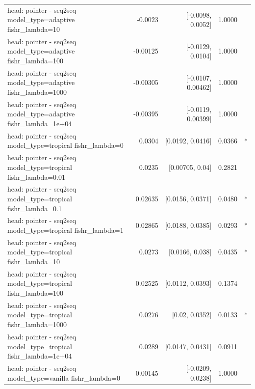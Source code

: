 \documentclass[10pt]{article}
\makeatletter
\newcommand{\stackcell}[1]{\begin{tabular}[t]{@{}l@{}}#1\end{tabular}}
\makeatother
\begin{document}
{\begin{longtable}{lrrrl}
\stackcell{head: pointer - seq2seq\\\footnotesize model\_type=adaptive fishr\_lambda=10 } & -0.0023 & [-0.0098, 0.0052] & 1.0000 & \\
\stackcell{head: pointer - seq2seq\\\footnotesize model\_type=adaptive fishr\_lambda=100 } & -0.00125 & [-0.0129, 0.0104] & 1.0000 & \\
\stackcell{head: pointer - seq2seq\\\footnotesize model\_type=adaptive fishr\_lambda=1000 } & -0.00305 & [-0.0107, 0.00462] & 1.0000 & \\
\stackcell{head: pointer - seq2seq\\\footnotesize model\_type=adaptive fishr\_lambda=1e+04 } & -0.00395 & [-0.0119, 0.00399] & 1.0000 & \\
\stackcell{head: pointer - seq2seq\\\footnotesize model\_type=tropical fishr\_lambda=0 } & 0.0304 & [0.0192, 0.0416] & 0.0366 & *\\
\stackcell{head: pointer - seq2seq\\\footnotesize model\_type=tropical fishr\_lambda=0.01 } & 0.0235 & [0.00705, 0.04] & 0.2821 & \\
\stackcell{head: pointer - seq2seq\\\footnotesize model\_type=tropical fishr\_lambda=0.1 } & 0.02635 & [0.0156, 0.0371] & 0.0480 & *\\
\stackcell{head: pointer - seq2seq\\\footnotesize model\_type=tropical fishr\_lambda=1 } & 0.02865 & [0.0188, 0.0385] & 0.0293 & *\\
\stackcell{head: pointer - seq2seq\\\footnotesize model\_type=tropical fishr\_lambda=10 } & 0.0273 & [0.0166, 0.038] & 0.0435 & *\\
\stackcell{head: pointer - seq2seq\\\footnotesize model\_type=tropical fishr\_lambda=100 } & 0.02525 & [0.0112, 0.0393] & 0.1374 & \\
\stackcell{head: pointer - seq2seq\\\footnotesize model\_type=tropical fishr\_lambda=1000 } & 0.0276 & [0.02, 0.0352] & 0.0133 & *\\
\stackcell{head: pointer - seq2seq\\\footnotesize model\_type=tropical fishr\_lambda=1e+04 } & 0.0289 & [0.0147, 0.0431] & 0.0911 & \\
\stackcell{head: pointer - seq2seq\\\footnotesize model\_type=vanilla fishr\_lambda=0 } & 0.00145 & [-0.0209, 0.0238] & 1.0000 & \\

\end{longtable}}
\end{document}
